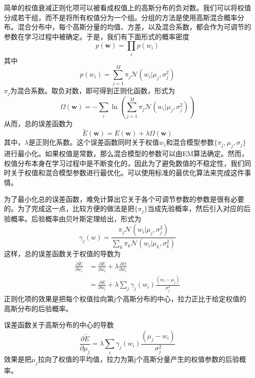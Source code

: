 简单的权值衰减正则化项可以被看成权值上的高斯分布的负对数。我们可以将权值分成若干组，而不是将所有权值分为一个组。分组的方法是使用高斯混合概率分布。混合分布中，每个高斯分量的均值、方差，以及混合系数，都会作为可调节的参数在学习过程中被确定。于是，我们有下面形式的概率密度
\begin{equation}
	p(\boldsymbol{w})=\prod_ip(w_i)
\end{equation}
其中
\begin{equation}
	p(w_i)=\sum_{j=1}^{M}\pi_j\mathcal{N}(w_i|\mu_j,\sigma_j^2)
\end{equation}
$\pi_j$为混合系数。取负对数，即可得到正则化函数，形式为
\begin{equation}
	\Omega(\boldsymbol{w})=-\sum_i\ln\left(\sum_{j=1}^{M}\pi_j\mathcal{N}(w_i|\mu_j,\sigma_j^2) \right)
\end{equation}
从而，总的误差函数为
\begin{equation}
	\tilde{E}(\boldsymbol{w})=E(\boldsymbol{w})+\lambda \Omega(\boldsymbol{w})
\end{equation}
其中，$\lambda$是正则化系数。这个误差函数同时关于权值$w_i$和混合模型参数$\{\pi_j,\mu_j,\sigma_j \}$进行最小化。如果权值是常数，那么混合模型的参数可以由EM算法确定。然而，权值分布本身在学习过程中是不断变化的，因此为了避免数值的不稳定性，我们同时关于权值和混合模型参数进行最优化。可以使用标准的最优化算法来完成这件事情。

为了最小化总的误差函数，难免计算出它关于各个可调节参数的参数是很有必要的。为了完成这一点，比较方便的做法是把$\{\pi_j \}$当成先验概率，然后引入对应的后验概率。后验概率由贝叶斯定理给出，形式为
\begin{equation}
	\gamma_j(w)=\frac{\pi_j\mathcal{N}(w_i|\mu_j,\sigma_j^2)}{\sum_k\pi_k\mathcal{N}(w_i|\mu_k,\sigma_k^2)}
\end{equation}
这样，总的误差函数关于权值的导数为
\begin{equation}
	\begin{aligned}
	\frac{\partial \tilde{E}}{\partial w_i}&=\frac{\partial E}{\partial w_i}+\lambda\frac{\partial \Omega}{\partial w_i}\\
	&=\frac{\partial E}{\partial w_i}+\lambda\sum_{j}\gamma_j(w_i)\frac{(w_i-\mu_j)}{\sigma_j^2}
	\end{aligned}
\end{equation}
正则化项的效果是把每个权值拉向第j个高斯分布的中心，拉力正比于给定权值的高斯分布的后验概率。

误差函数关于高斯分布的中心的导数
\begin{equation}
	\frac{\partial \tilde{E}}{\partial \mu_j}=\lambda\sum_i\gamma_j(w_i)\frac{(\mu_j-w_i)}{\sigma_j^2}
\end{equation}
效果是把$\mu_j$拉向了权值的平均值，拉力为第j个高斯分量产生的权值参数的后验概率。

